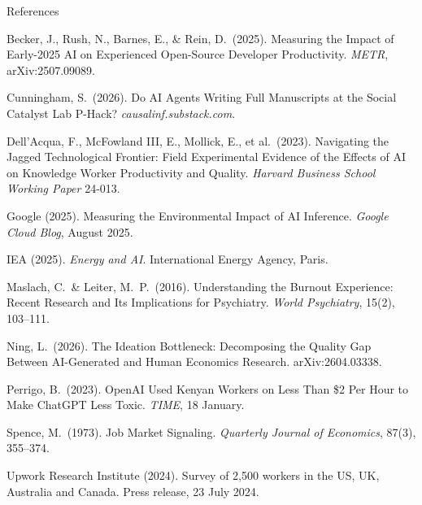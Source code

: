 \documentclass[svgnames,x11names,dvipsnames]{beamer}
\begin{document}
\begin{frame}{References}

{\scriptsize

Becker, J., Rush, N., Barnes, E., \& Rein, D.\ (2025). Measuring the Impact of Early-2025 AI on Experienced Open-Source Developer Productivity. \textit{METR}, arXiv:2507.09089.

\vspace{0.05cm}

Cunningham, S.\ (2026). Do AI Agents Writing Full Manuscripts at the Social Catalyst Lab P-Hack? \textit{causalinf.substack.com}.

\vspace{0.05cm}

Dell'Acqua, F., McFowland III, E., Mollick, E., et al.\ (2023). Navigating the Jagged Technological Frontier: Field Experimental Evidence of the Effects of AI on Knowledge Worker Productivity and Quality. \textit{Harvard Business School Working Paper} 24-013.

\vspace{0.05cm}

Google (2025). Measuring the Environmental Impact of AI Inference. \textit{Google Cloud Blog}, August 2025.

\vspace{0.05cm}

IEA (2025). \textit{Energy and AI}. International Energy Agency, Paris.

\vspace{0.05cm}

Maslach, C.\ \& Leiter, M.\ P.\ (2016). Understanding the Burnout Experience: Recent Research and Its Implications for Psychiatry. \textit{World Psychiatry}, 15(2), 103--111.

\vspace{0.05cm}

Ning, L.\ (2026). The Ideation Bottleneck: Decomposing the Quality Gap Between AI-Generated and Human Economics Research. arXiv:2604.03338.

\vspace{0.05cm}

Perrigo, B.\ (2023). OpenAI Used Kenyan Workers on Less Than \$2 Per Hour to Make ChatGPT Less Toxic. \textit{TIME}, 18 January.

\vspace{0.05cm}

Spence, M.\ (1973). Job Market Signaling. \textit{Quarterly Journal of Economics}, 87(3), 355--374.

\vspace{0.05cm}

Upwork Research Institute (2024). Survey of 2,500 workers in the US, UK, Australia and Canada. Press release, 23 July 2024.

}

\end{frame}
\end{document}
